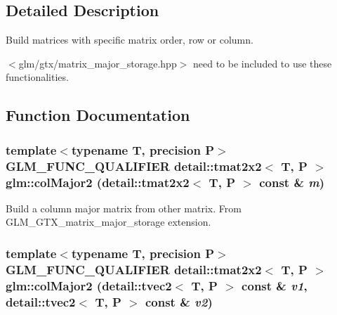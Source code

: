 \subsection{Detailed Description}
Build matrices with specific matrix order, row or column. 

$<$glm/gtx/matrix\_\-major\_\-storage.hpp$>$ need to be included to use these functionalities. 

\subsection{Function Documentation}
\hypertarget{group__gtx__matrix__major__storage_g095b6bfd85a85c3a0878b86363e3d0aa}{
\subsubsection[colMajor2]{\setlength{\rightskip}{0pt plus 5cm}template$<$typename T, precision P$>$ GLM\_\-FUNC\_\-QUALIFIER detail::tmat2x2$<$ T, P $>$ glm::colMajor2 (detail::tmat2x2$<$ T, P $>$ const \& {\em m})}}
\label{group__gtx__matrix__major__storage_g095b6bfd85a85c3a0878b86363e3d0aa}


Build a column major matrix from other matrix. From GLM\_\-GTX\_\-matrix\_\-major\_\-storage extension. \hypertarget{group__gtx__matrix__major__storage_g3e3ecc119e43821d7ac582124ef891cb}{
\subsubsection[colMajor2]{\setlength{\rightskip}{0pt plus 5cm}template$<$typename T, precision P$>$ GLM\_\-FUNC\_\-QUALIFIER detail::tmat2x2$<$ T, P $>$ glm::colMajor2 (detail::tvec2$<$ T, P $>$ const \& {\em v1}, \/  detail::tvec2$<$ T, P $>$ const \& {\em v2})}}
\label{group__gtx__matrix__major__storage_g3e3ecc119e43821d7ac582124ef891cb}



